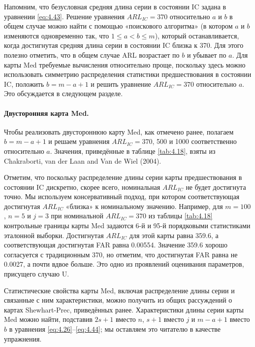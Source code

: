 Напомним, что безусловная средняя длина серии в состоянии IC задана в уравнении \eqref{eq:4.43}. Решение уравнения \(ARL_{IC} = 370\) относительно \(a\) и \(b\) в общем случае можно найти с помощью «поискового алгоритма» (в котором \(a\) и \(b\) изменяются одновременно так, что \(1 \le a < b \le m\)), который останавливается, когда достигнутая средняя длина серии в состоянии IC близка к 370. Для этого полезно отметить, что в общем случае ARL возрастает по \(b\) и убывает по \(a\). Для карты Med требуемые вычисления относительно проще, поскольку здесь можно использовать симметрию распределения статистики предшествования в состоянии IC, положить \(b = m - a + 1\) и решить уравнение \(ARL_{IC} = 370\) относительно \(a\). Это обсуждается в следующем разделе.

\paragraph{Двусторонняя карта Med.} Чтобы реализовать двустороннюю карту Med, как отмечено ранее, полагаем \(b = m - a + 1\) и решаем уравнения \(ARL_{IC} = 370\), 500 и 1000 соответственно относительно \(a\). Значения, приведённые в таблице \ref{tab:4.18}, взяты из Chakraborti, van der Laan and Van de Wiel (2004).

Отметим, что поскольку распределение длины серии карты предшествования в состоянии IC дискретно, скорее всего, номинальная \(ARL_{IC}\) не будет достигнута точно. Мы используем консервативный подход, при котором соответствующая достигнутая \(ARL_{IC}\) «близка» к номинальному значению. Например, для \(m = 100\), \(n = 5\) и \(j = 3\) при номинальной \(ARL_{IC} = 370\) из таблицы \ref{tab:4.18} контрольные границы карты Med задаются 6-й и 95-й порядковыми статистиками эталонной выборки. Достигнутая \(ARL_{IC}\) для этой карты равна 359.6, а соответствующая достигнутая FAR равна 0.00554. Значение 359.6 хорошо согласуется с традиционным 370, но отметим, что достигнутая FAR равна не 0.0027, а почти вдвое больше. Это одно из проявлений оценивания параметров, присущего случаю U.

Статистические свойства карты Med, включая распределение длины серии и связанные с ним характеристики, можно получить из общих рассуждений о картах Shewhart-Prec, приведённых ранее. Характеристики длины серии карты Med можно найти, подставив \(2s + 1\) вместо \(n\), \(s + 1\) вместо \(j\) и \(m - a + 1\) вместо \(b\) в уравнения \eqref{eq:4.26}--\eqref{eq:4.44}; мы оставляем это читателю в качестве упражнения.

